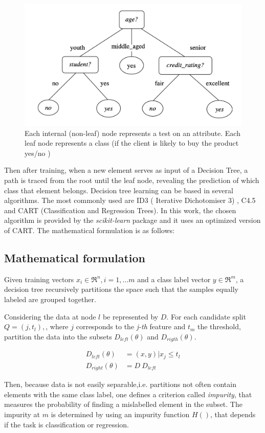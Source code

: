 \begin{figure}[H]
	\centering
	\includegraphics[scale=0.5, width=0.6\linewidth]{figures/DecisionTreeDiagram.png}
	\caption{Each internal (non-leaf) node represents a test on an attribute. Each leaf node represents a class (if the client is likely to buy the product yes/no )}
	\label{DTDiagram}
\end{figure} 

Then after training, when a new element serves as input of a Decision Tree, a path is traced from the root until the leaf node, revealing the prediction of which class that element belongs. Decision tree learning can be based in several algorithms. The most commonly used are ID3 ( Iterative Dichotomiser 3) , C4.5 and CART (Classification and Regression Trees). In this work, the chosen algorithm is provided by the \textit{scikit-learn} package and it uses an optimized version of CART. The mathematical formulation is as follows: 

\subsection{Mathematical formulation}

Given training vectors $x_i \in \Re^n, i = {1 , ... m} $ and a class label vector $y \in \Re^m$, a decision tree recursively partitions the space such that the samples equally labeled are grouped together. 

Considering the data at node $l$ be represented by $D$. For each candidate split $Q= (j, t_l),$, where $j$ corresponds to the \textit{j-th} feature and $t_m$ the threshold, partition the data into the subsets $D_{left}(\theta)$ and $D_{rigth}(\theta) $.

\begin{align}
	D_{left}(\theta) &= (x,y) | x_j \le t_l \\
	D_{right}(\theta) &= D \ D_{left}
\end{align}

Then, because data is not easily separable,i.e. partitions not often contain elements with the same class label, one defines a criterion called \textit{impurity}, that measures the probability of finding a mislabelled element in the subset. The impurity at $m$ is determined by using an impurity function $H()$, that depends if the task is classification or regression. 


